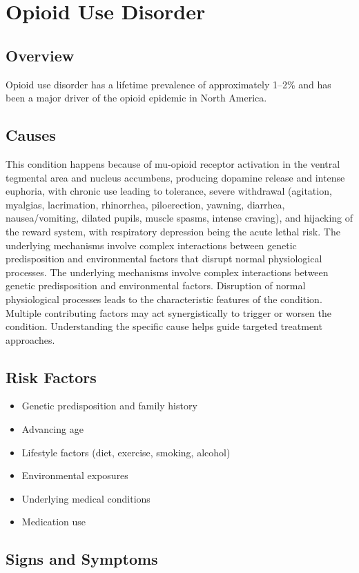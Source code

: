 \chapter{Opioid Use Disorder}
\label{sec:Opioid Use Disorder}

\section{Overview}
Opioid use disorder has a lifetime prevalence of approximately 1--2\% and has been a major driver of the opioid epidemic in North America.
\section{Causes}
This condition happens because of mu-opioid receptor activation in the ventral tegmental area and nucleus accumbens, producing dopamine release and intense euphoria, with chronic use leading to tolerance, severe withdrawal (agitation, myalgias, lacrimation, rhinorrhea, piloerection, yawning, diarrhea, nausea/vomiting, dilated pupils, muscle spasms, intense craving), and hijacking of the reward system, with respiratory depression being the acute lethal risk. The underlying mechanisms involve complex interactions between genetic predisposition and environmental factors that disrupt normal physiological processes. The underlying mechanisms involve complex interactions between genetic predisposition and environmental factors. Disruption of normal physiological processes leads to the characteristic features of the condition. Multiple contributing factors may act synergistically to trigger or worsen the condition. Understanding the specific cause helps guide targeted treatment approaches.
\section{Risk Factors}


\begin{itemize}[noitemsep]
  \item Genetic predisposition and family history
  \item Advancing age
  \item Lifestyle factors (diet, exercise, smoking, alcohol)
  \item Environmental exposures
  \item Underlying medical conditions
  \item Medication use
\end{itemize}
\section{Signs and Symptoms}

